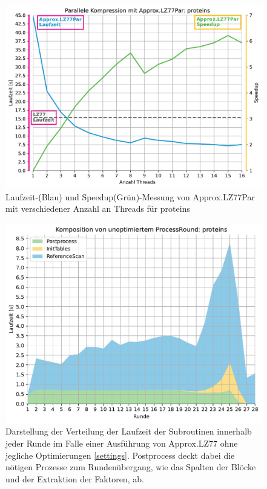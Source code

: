 \begin{figure}[H]
    \centering
    \includegraphics[scale=0.65]{Images/progressive_speedup_proteins.pdf}
    \caption{Laufzeit-(Blau) und Speedup(Grün)-Messung von Approx.LZ77Par mit verschiedener Anzahl an Threads für proteins}
    \label{runtime_threads}
\end{figure}

\begin{figure}[H]
    \centering
    \includegraphics[scale=0.63]{Images/progressive_unopt_stack.pdf}
    \caption{Darstellung der Verteilung der Laufzeit der Subroutinen innerhalb jeder Runde im Falle einer Ausführung von Approx.LZ77 ohne jegliche Optimierungen \ref{settings}.
    Postprocess deckt dabei die nötigen Prozesse zum Rundenübergang, wie das Spalten der Blöcke und der Extraktion der Faktoren, ab.}
    \label{unopt}
\end{figure}

